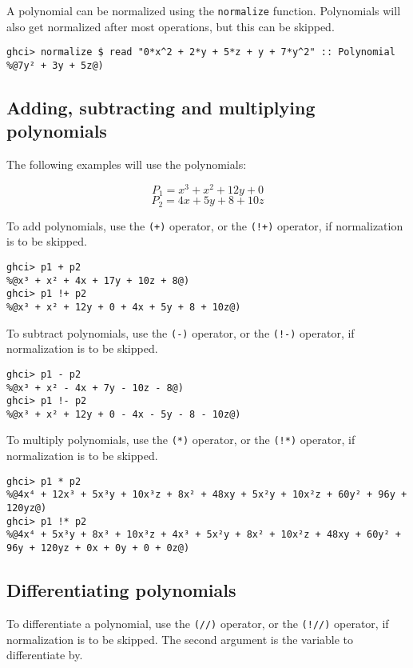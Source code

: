 \documentclass[11pt,a4paper]{article}
\begin{document}
A polynomial can be normalized using the \lstinline{normalize} function.
Polynomials will also get normalized after most operations, but this can be skipped.

\begin{lstlisting}
ghci> normalize $ read "0*x^2 + 2*y + 5*z + y + 7*y^2" :: Polynomial
%@7y² + 3y + 5z@)
\end{lstlisting}

\subsection{Adding, subtracting and multiplying polynomials}

The following examples will use the polynomials:

$$ P_1 = x^3 + x^2 + 12y + 0 $$
$$ P_2 = 4x + 5y + 8 + 10z $$

To add polynomials, use the \lstinline{(+)} operator, or the \lstinline{(!+)} operator, if normalization is to be skipped.

\begin{lstlisting}
ghci> p1 + p2
%@x³ + x² + 4x + 17y + 10z + 8@)
ghci> p1 !+ p2
%@x³ + x² + 12y + 0 + 4x + 5y + 8 + 10z@)
\end{lstlisting}

To subtract polynomials, use the \lstinline{(-)} operator, or the \lstinline{(!-)} operator, if normalization is to be skipped.

\begin{lstlisting}
ghci> p1 - p2
%@x³ + x² - 4x + 7y - 10z - 8@)
ghci> p1 !- p2
%@x³ + x² + 12y + 0 - 4x - 5y - 8 - 10z@)
\end{lstlisting}

To multiply polynomials, use the \lstinline{(*)} operator, or the \lstinline{(!*)} operator, if normalization is to be skipped.

\begin{lstlisting}
ghci> p1 * p2
%@4x⁴ + 12x³ + 5x³y + 10x³z + 8x² + 48xy + 5x²y + 10x²z + 60y² + 96y + 120yz@)
ghci> p1 !* p2
%@4x⁴ + 5x³y + 8x³ + 10x³z + 4x³ + 5x²y + 8x² + 10x²z + 48xy + 60y² + 96y + 120yz + 0x + 0y + 0 + 0z@)
\end{lstlisting}

\subsection{Differentiating polynomials}

To differentiate a polynomial, use the \lstinline{(//)} operator, or the \lstinline{(!//)} operator, if normalization is to be skipped.
The second argument is the variable to differentiate by.
\end{document}
